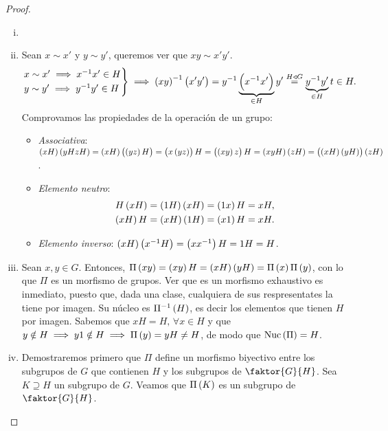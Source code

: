 \begin{proof}
    \begin{enumerate}[i)]
        \item[]
        \item Sean $x\sim x'$ y $y\sim y'$, queremos ver que $xy\sim x'y'$.
            \[
                \begin{rcases}
                    x\sim x' \implies x^{-1}x' \in H\\
                    y\sim y' \implies y^{-1}y' \in H
                \end{rcases}
                \implies \left( xy\right) ^{-1}\left( x'y'\right) = y^{-1} \underbrace{\left( x^{-1}x'\right)}_{\in H} y'\stackrel{H\triangleleft G}{=} \underbrace{y^{-1}y'}_{\in H}t \in H.
            \]
            Comprovamos las propiedades de la operación de un grupo:
            \begin{itemize}
                \item \emph{Associativa}: $\left( xH\right)\left( yHzH\right) = \left( xH\right) \left(\left( yz\right) H\right) = \left( x\left( yz\right) \right) H = \left( \left( xy\right) z\right) H = \left( xyH\right) \left( zH\right) = \left( \left( xH\right) \left( yH\right) \right) \left( zH\right)$.
                \item \emph{Elemento neutro}:
                    \begin{align*}
                        H\left( xH\right) &= \left( 1H\right) \left( xH\right) = \left( 1x\right) H = xH, \\
                        \left( xH\right) H &= \left( xH\right) \left( 1H\right) = \left( x1\right) H = xH.
                    \end{align*}
                \item \emph{Elemento inverso}: $\left( xH\right)\left( x^{-1}H\right) = \left( xx^{-1}\right) H = 1H = H$.
            \end{itemize}
        \item Sean $x, y\in G$. Entonces, $\Pi\left( xy\right) = \left( xy\right) H=\left( xH\right)\left( yH\right) = \Pi\left( x\right)\Pi\left( y\right)$, con lo que $\Pi$ es un morfismo de grupos. Ver que es un morfismo exhaustivo es inmediato, puesto que, dada una clase, cualquiera de sus respresentates la tiene por imagen. Su núcleo es $\Pi^{-1}\left( H\right)$, es decir los elementos que tienen $H$ por imagen. Sabemos que $xH=H,\,\forall x\in H$ y que $y\notin H\implies y1\notin H\implies \Pi\left( y\right)=yH\neq H$, de modo que $\operatorname{Nuc}\left(\Pi\right)=H$.
        \item Demostraremos primero que $\Pi$ define un morfismo biyectivo entre los subgrupos de $G$ que contienen $H$ y los subgrupos de $\faktor{G}{H}$. Sea $K\supseteq H$ un subgrupo de $G$. Veamos que $\Pi\left( K\right)$ es un subgrupo de $\faktor{G}{H}$.

\end{enumerate}
\end{proof}

